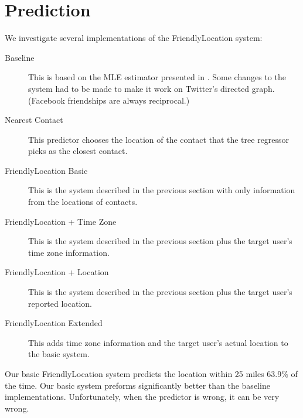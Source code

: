 \section{Prediction}
We investigate several implementations of the FriendlyLocation system:
\begin{description}
\item[Baseline] This is based on the MLE estimator presented in
    \cite{backstrom2010find}. Some changes to the system had to be made to make it
    work on Twitter's directed graph. (Facebook friendships are always
    reciprocal.)
\item[Nearest Contact] This predictor chooses the location of the contact that
    the tree regressor picks as the closest contact.
\item[FriendlyLocation Basic] This is the system described in the previous
    section with only information from the locations of contacts.
\item[FriendlyLocation + Time Zone] This is the system described in the previous
    section plus the target user's time zone information.
\item[FriendlyLocation + Location] This is the system described in the previous
    section plus the target user's reported location.
\item[FriendlyLocation Extended] This adds time zone information and the target
    user's actual location to the basic system.
\end{description}

Our basic FriendlyLocation system predicts the location within 25 miles 63.9\% of
the time.
%
Our basic system preforms significantly better than the baseline implementations.
%
Unfortunately, when the predictor is wrong, it can be very wrong.
%
%


